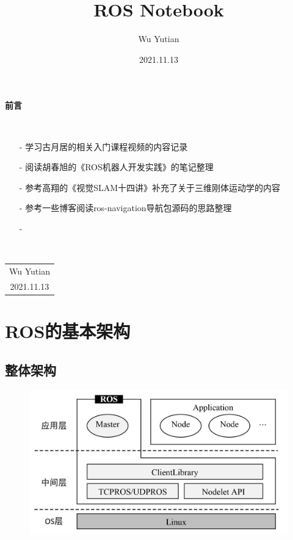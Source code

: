 \documentclass[9pt, oneside]{book}
\title{\Huge{\textbf{ROS Notebook}}}
\author{Wu Yutian}
\date{2021.11.13}
\begin{document}
\maketitle

\setcounter{page}{1}

\begin{center}
    \Huge\textbf{前言}
\end{center}~\

\normalsize
\begin{itemize}
    \item [-] 学习古月居的相关入门课程视频的内容记录
    \item [-] 阅读胡春旭的《ROS机器人开发实践》的笔记整理
    \item [-] 参考高翔的《视觉SLAM十四讲》补充了关于三维刚体运动学的内容
    \item [-] 参考一些博客阅读ros-navigation导航包源码的思路整理
    \item [-]
\end{itemize}

~\\
\begin{flushright}     
    \begin{tabular}{c}
        Wu Yutian\\
        2021.11.13
    \end{tabular}
\end{flushright}

\newpage
{}
\setcounter{page}{1}
\tableofcontents
\newpage
\setcounter{page}{1}

\chapter{ROS的基本架构}

\section{整体架构}

\begin{figure}[H]
    \centering
    \includegraphics[width=0.6\linewidth]{image/ROS1架构.jpg}
\end{figure}
\end{document}
